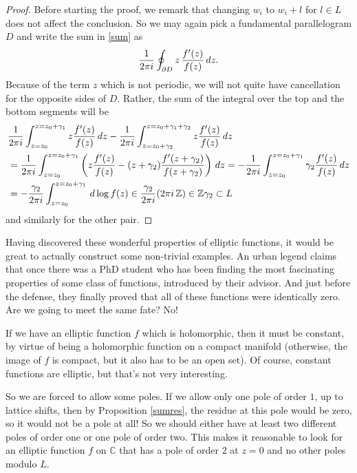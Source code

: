 \documentclass[11pt]{article}
\numberwithin{equation}{section}
\numberwithin{footnote}{section}
\newcommand{\Z}{{\mathbb Z}}
\newcommand{\C}{{\mathbb C}}
\begin{document}
\begin{proof}
Before starting the proof, we remark that changing  $w_i$ to $w_i+l$ for $l\in L$ does not affect the conclusion. So we may again pick a fundamental parallelogram $D$ and write the sum in \eqref{sum} as
$$
\frac 1{2\pi{\rm i}} \oint_{\partial D} z\, \frac {f'(z)}{f(z)}\, dz.
$$
Because of the term $z$ which is not periodic, we will not quite have cancellation for the opposite sides of $D$. Rather, the sum 
of the integral over the top and the bottom segments will be
\begin{align*}
&
\frac 1{2\pi{\rm i}} \int_{z=z_0}^{z=z_0+\gamma_1} z \frac {f'(z)}{f(z)}\, dz -
\frac 1{2\pi{\rm i}} \int_{z=z_0+\gamma_2}^{z=z_0+\gamma_1+\gamma_2} z \frac {f'(z)}{f(z)}\, dz
\\
&=
\frac 1{2\pi{\rm i}} \int_{z=z_0}^{z=z_0+\gamma_1}\left( z \frac {f'(z)}{f(z)}-(z+\gamma_2) \frac {f'(z+\gamma_2)}{f(z+\gamma_2)}\right)\, dz 
=-\frac 1{2\pi{\rm i}} 
\int_{z=z_0}^{z=z_0+\gamma_1} \gamma_2 \frac {f'(z)}{f(z)}\, dz
\\
&=- \frac {\gamma_2}{2\pi{\rm i}} 
\int_{z=z_0}^{z=z_0+\gamma_1}\,d \log f(z) \in \frac { \gamma_2}{2\pi{\rm i}} (2\pi{\rm i} \,\Z) \in \Z \gamma_2 \subset L
\end{align*}
and similarly for the other pair.
\end{proof}

Having discovered these wonderful properties of elliptic functions,  it would be great to actually construct some non-trivial examples. An urban legend claims that once there was a PhD student who has been finding the most fascinating properties of some class of functions, introduced by their advisor. And just before the defense, they finally proved that all of these functions were identically zero. Are we going to meet the same fate? No!

\smallskip
If we have an elliptic function $f$ which is holomorphic, then it must be constant, by virtue of being a holomorphic function on a compact manifold (otherwise, the image of $f$ is compact, but it also has to be an open set).
Of course, constant functions are elliptic, but that's not very interesting.

\smallskip
So we are forced to allow some poles. If we allow only one pole of order $1$, up to lattice shifts, then by Proposition \ref{sumres}, the residue at this pole would be zero, so it would not be a pole at all! So we should either have at least two different poles of order one or one pole of order two. This makes it reasonable to look for an elliptic function $f$ on $\C$  that 
has a pole of order $2$ at $z=0$ and no other poles modulo $L$.
\end{document}

